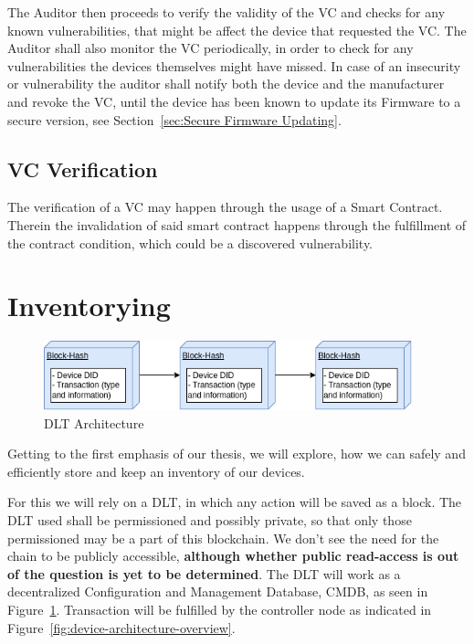 The Auditor then proceeds to verify the validity of the VC and checks for any known vulnerabilities, that might be
affect the device that requested the VC. The Auditor shall also monitor the VC periodically, in order to check for any
vulnerabilities the devices themselves might have missed. In case of an insecurity or vulnerability the auditor shall
notify both the device and the manufacturer and revoke the VC, until the device has been known to update its Firmware to
a secure version, see Section~\ref{sec:Secure Firmware Updating}.

\subsection{VC Verification} %
\label{sub:VC Verification}
The verification of a VC may happen through the usage of a Smart Contract. Therein the invalidation of
said smart contract happens through the fulfillment of the contract condition, which could be a discovered
vulnerability.



\section{Inventorying} %
\label{sec:Inventorying}

\begin{figure}
	\begin{center}
		\includegraphics[width=0.95\textwidth]{figures/dlt-architecture.png}
	\end{center}
	\caption{DLT Architecture}
	\label{fig:dlt-architecture}
\end{figure}

Getting to the first emphasis of our thesis, we will explore, how we can safely and efficiently store and keep an
inventory of our devices.

For this we will rely on a DLT, in which any action will be saved as a block. The DLT used shall be permissioned and
possibly private, so that only those permissioned may be a part of this blockchain. We don't see the need for the chain
to be publicly accessible, \textbf{although whether public read-access is out of the question is yet to be determined}.
The DLT will work as a decentralized Configuration and Management Database, CMDB, as seen in
Figure~\ref{fig:dlt-architecture}. Transaction will be fulfilled by the controller node as indicated in
Figure~\ref{fig:device-architecture-overview}.

